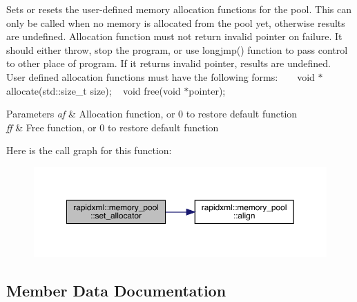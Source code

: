 Sets or resets the user-\/defined memory allocation functions for the pool. This can only be called when no memory is allocated from the pool yet, otherwise results are undefined. Allocation function must not return invalid pointer on failure. It should either throw, stop the program, or use {\ttfamily longjmp()} function to pass control to other place of program. If it returns invalid pointer, results are undefined. ~\newline
~\newline
 User defined allocation functions must have the following forms\+: ~\newline
{\ttfamily  ~\newline
void $\ast$allocate(std\+::size\+\_\+t size); ~\newline
void free(void $\ast$pointer); }~\newline
 
\begin{DoxyParams}{Parameters}
{\em af} & Allocation function, or 0 to restore default function \\
\hline
{\em ff} & Free function, or 0 to restore default function \\
\hline
\end{DoxyParams}
Here is the call graph for this function\+:\nopagebreak
\begin{figure}[H]
\begin{center}
\leavevmode
\includegraphics[width=350pt]{classrapidxml_1_1memory__pool_a84d3d8d2cdfc00501e1dcf26d889ae03_cgraph}
\end{center}
\end{figure}


\subsection{Member Data Documentation}
\mbox{\label{classrapidxml_1_1memory__pool_ae8964773675d24f77a808356be773c1d}} 
